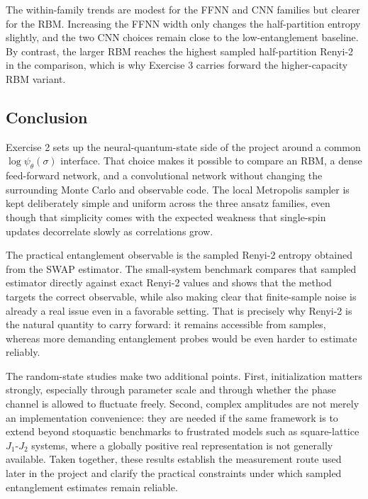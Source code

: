 \documentclass[11pt,a4paper]{article}
\begin{document}
The within-family trends are modest for the FFNN and CNN families but clearer for the RBM. Increasing the FFNN width only changes the half-partition entropy slightly, and the two CNN choices remain close to the low-entanglement baseline. By contrast, the larger RBM reaches the highest sampled half-partition Renyi-2 in the comparison, which is why Exercise 3 carries forward the higher-capacity RBM variant.

\subsection*{Conclusion}

Exercise 2 sets up the neural-quantum-state side of the project around a common $\log \psi_\theta(\sigma)$ interface. That choice makes it possible to compare an RBM, a dense feed-forward network, and a convolutional network without changing the surrounding Monte Carlo and observable code. The local Metropolis sampler is kept deliberately simple and uniform across the three ansatz families, even though that simplicity comes with the expected weakness that single-spin updates decorrelate slowly as correlations grow.

The practical entanglement observable is the sampled Renyi-2 entropy obtained from the SWAP estimator. The small-system benchmark compares that sampled estimator directly against exact Renyi-2 values and shows that the method targets the correct observable, while also making clear that finite-sample noise is already a real issue even in a favorable setting. That is precisely why Renyi-2 is the natural quantity to carry forward: it remains accessible from samples, whereas more demanding entanglement probes would be even harder to estimate reliably.

The random-state studies make two additional points. First, initialization matters strongly, especially through parameter scale and through whether the phase channel is allowed to fluctuate freely. Second, complex amplitudes are not merely an implementation convenience: they are needed if the same framework is to extend beyond stoquastic benchmarks to frustrated models such as square-lattice $J_1$-$J_2$ systems, where a globally positive real representation is not generally available. Taken together, these results establish the measurement route used later in the project and clarify the practical constraints under which sampled entanglement estimates remain reliable.
\end{document}
